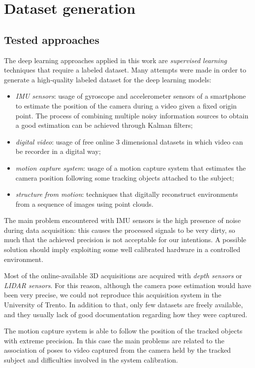 \section{Dataset generation}
\subsection{Tested approaches}
The deep learning approaches applied in this work are \emph{supervised learning} techniques that require a labeled dataset. Many attempts were made in order to generate a high-quality labeled dataset for the deep learning models:
\begin{itemize}
    \item \emph{IMU sensors}: usage of gyroscope and accelerometer sensors of a smartphone to estimate the position of the camera during a video given a fixed origin point. The process of combining multiple noisy information sources to obtain a good estimation can be achieved through Kalman filters;
    \item \emph{digital video}: usage of free online 3 dimensional datasets in which video can be recorder in a digital way;
    \item \emph{motion capture system}: usage of a motion capture system that estimates the camera position following some tracking objects attached to the subject;
    \item \emph{structure from motion}: techniques that digitally reconstruct environments from a sequence of images using point clouds.
\end{itemize}

The main problem encountered with IMU sensors is the high presence of noise during data acquisition: this causes the processed signals to be very dirty, so much that the achieved precision is not acceptable for our intentions. A possible solution should imply exploiting some well calibrated hardware in a controlled environment.

Most of the online-available 3D acquisitions are acquired with \emph{depth sensors} or \emph{LIDAR sensors}. For this reason, although the camera pose estimation would have been very precise, we could not reproduce this acquisition system in the University of Trento. In addition to that, only few datasets are freely available, and they usually lack of good documentation regarding how they were captured.

The motion capture system is able to follow the position of the tracked objects with extreme precision. In this case the main problems are related to the association of poses to video captured from the camera held by the tracked subject and difficulties involved in the system calibration.

